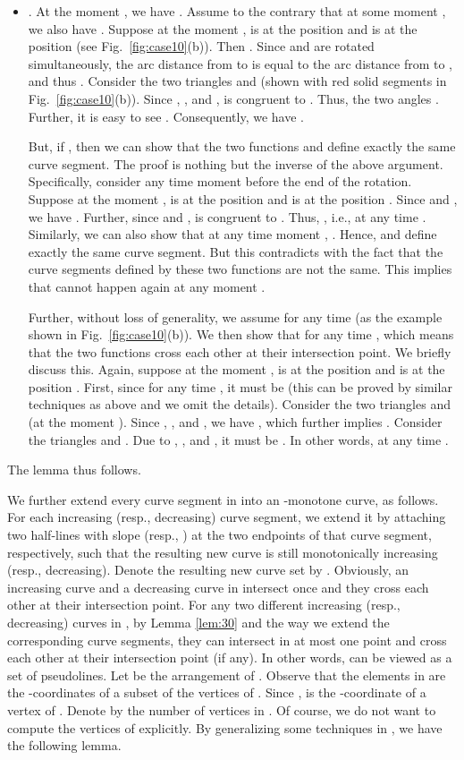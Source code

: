 \documentclass[11pt]{article}
\newenvironment{proof}{\noindent {\textbf{Proof:}}\rm}{\hfill 
\rm}
\begin{document}
\begin{proof}
\begin{itemize}
\item
. At the moment , we have .
Assume to the contrary that at some moment , we also have
. Suppose at the moment ,  is at
the position  and  is at the position  (see
Fig.~\ref{fig:case10}(b)). Then . Since 
and  are rotated simultaneously, the arc distance from  to
 is equal to the arc distance from  to , and thus
. Consider the two triangles 
and  (shown with red solid segments
in Fig.~\ref{fig:case10}(b)).
Since , , and
,  is congruent to
. Thus, the two angles . Further, it is easy to see
. Consequently, we have .

But, if , then we can show that the
two functions  and  define exactly the
same curve segment. The proof is nothing but the inverse of the
above argument. Specifically, consider any time moment 
before the end of the rotation. Suppose at the moment ,  is
at the position  and  is at the position . Since
 and , we have . Further,
since  and ,  is congruent to . Thus,
, i.e.,  at any time .
Similarly, we can also show that at any time moment ,
. Hence,  and
 define exactly the same curve segment. But this
contradicts with the fact that the curve segments defined by these two
functions are not the same. This implies that
 cannot happen again at any moment .

Further, without loss of generality, we assume
 for any time  (as
the example shown in Fig.~\ref{fig:case10}(b)). We then show that
 for any time , which means that
the two functions cross each other at their intersection point. We
briefly discuss this.  Again, suppose at the moment ,  is
at the position  and  is at the position . First,
since  for any time , it must be
 (this can be proved by similar techniques as above and
we omit the details). Consider the two triangles  and
 (at the moment ). Since
, , and , we have
, which further implies . Consider the triangles  and . Due to ,
, and ,
it must be . In
other words,  at any time .
\end{itemize}

The lemma thus follows.
\end{proof}

We further extend every curve segment in  into an -monotone
curve, as follows. For each increasing (resp., decreasing) curve
segment, we extend it by attaching two half-lines with slope 
(resp., ) at the two endpoints of that curve segment,
respectively, such that the resulting new curve is still monotonically increasing
(resp., decreasing). Denote the resulting new curve set by . Obviously, an
increasing curve and a decreasing curve in  intersect once and
they cross each other at their intersection point. For any two different increasing (resp.,
decreasing) curves in , by Lemma \ref{lem:30} and the way we
extend the corresponding curve segments, they can intersect in at
most one point and cross each other at their intersection point
(if any). In other words,  can be viewed as a set of pseudolines.
Let  be the arrangement of . Observe that the
elements in  are the -coordinates of a subset of the
vertices of . Since ,  is the
-coordinate of a vertex of . Denote by  the
number of vertices in . Of course, we do not want to compute
the vertices of  explicitly.  By generalizing some techniques in
\cite{ref:ColeAn89}, we have the following lemma.
\end{document}
